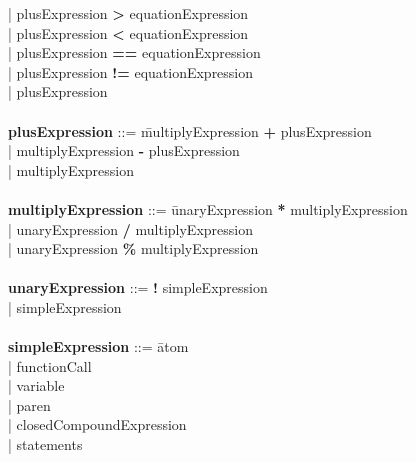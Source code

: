 \begin{tabbing}
                                                  \>| plusExpression \textbf{\textgreater{}} equationExpression\\
                                                  \>| plusExpression \textbf{\textless{}} equationExpression\\
                                                  \>| plusExpression \textbf{==} equationExpression\\
                                                  \>| plusExpression \textbf{!=} equationExpression\\
                                                  \>| plusExpression\\

            \\ 
            {\bf plusExpression}              ::= \=multiplyExpression \textbf{+} plusExpression\\
                                                  \>| multiplyExpression \textbf{-} plusExpression\\
                                                  \>| multiplyExpression\\
            \\
            {\bf multiplyExpression}          ::= \=unaryExpression \textbf{*} multiplyExpression\\
                                                  \>| unaryExpression \textbf{/} multiplyExpression\\
                                                  \>| unaryExpression \textbf{\%} multiplyExpression\\
            \\
            {\bf unaryExpression}             ::= \=\textbf{!} simpleExpression\\
                                                  \>| simpleExpression\\ 
            \\   
            {\bf simpleExpression}            ::= \=atom\\
                                                  \>| functionCall\\
                                                  \>| variable\\
                                                  \>| paren\\
                                                  \>| closedCompoundExpression\\
                                                  \>| statements\\

\end{tabbing}
